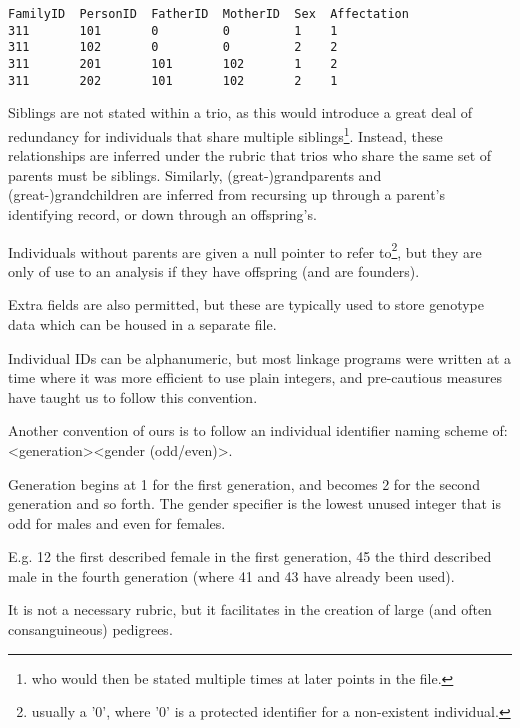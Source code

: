\begingroup
\begin{lstlisting}[label=verb:pedfile]
FamilyID  PersonID  FatherID  MotherID  Sex  Affectation
311       101       0         0         1    1
311       102       0         0         2    2
311       201       101       102       1    2
311       202       101       102       2    1
\end{lstlisting}
\endgroup

Siblings are not stated within a trio, as this would introduce a great deal of redundancy for individuals that share multiple siblings\footnote{who would then be stated multiple times at later points in the file.}. Instead, these relationships are inferred under the rubric that trios who share the same set of parents must be siblings. Similarly, (great-)grandparents and (great-)grandchildren are inferred from recursing up through a parent's identifying record, or down through an offspring's.

Individuals without parents are given a null pointer to refer to\footnote{usually a '0', where '0' is a protected identifier for a non-existent individual.}, but they are only of use to an analysis if they have offspring (and are founders).

\enlargethispage{-\baselineskip}
Extra fields are also permitted, but these are typically used to store genotype data which can be housed in a separate file.

Individual IDs can be alphanumeric, but most linkage programs were written at a time where it was more efficient to use plain integers, and pre-cautious measures have taught us to follow this convention.

Another convention of ours is to follow an individual identifier naming scheme of: <generation><gender (odd/even)>.

Generation begins at 1 for the first generation, and becomes 2 for the second generation and so forth. The gender specifier is the lowest unused integer that is odd for males and even for females.

E.g. 12 the first described female in the first generation, 45 the third described male in the fourth generation (where 41 and 43 have already been used).

It is not a necessary rubric, but it facilitates in the creation of large (and often consanguineous) pedigrees.

